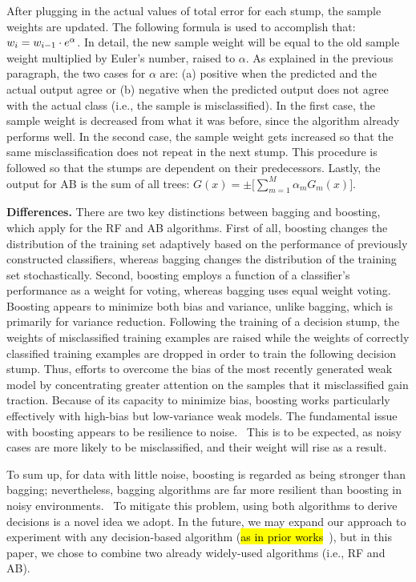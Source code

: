 After plugging in the actual values of total error for each stump, the sample weights are updated. The following formula is used to accomplish that: $w_i = w_{i-1} \cdot e^{\alpha}$.
In detail, the new sample weight will be equal to the old sample weight multiplied by Euler's number, raised to $\alpha$. As explained in the previous paragraph, the two cases for $\alpha$ are: (a) positive when the predicted and the actual output agree or (b) negative when the predicted output does not agree with the actual class (i.e., the sample is misclassified). In the first case, the sample weight is decreased from what it was before, since the algorithm already performs well. In the second case, the sample weight gets increased so that the same misclassification does not repeat in the next stump. This procedure is followed so that the stumps are dependent on their predecessors. Lastly, the output for AB is the sum of all trees: $G(x) = \pm \bigl[ \sum_{m = 1}^M \alpha_m G_m(x) \bigr]$.

\textbf{Differences.} There are two key distinctions between bagging and boosting, which apply for the RF and AB algorithms. First of all, boosting changes the distribution of the training set adaptively based on the performance of previously constructed classifiers, whereas bagging changes the distribution of the training set stochastically. Second, boosting employs a function of a classifier's performance as a weight for voting, whereas bagging uses equal weight voting. Boosting appears to minimize both bias and variance, unlike bagging, which is primarily for variance reduction. Following the training of a decision stump, the weights of misclassified training examples are raised while the weights of correctly classified training examples are dropped in order to train the following decision stump. Thus, efforts to overcome the bias of the most recently generated weak model by concentrating greater attention on the samples that it misclassified gain traction. Because of its capacity to minimize bias, boosting works particularly effectively with high-bias but low-variance weak models. The fundamental issue with boosting appears to be resilience to noise.~\cite{Bauer1999Empirical} This is to be expected, as noisy cases are more likely to be misclassified, and their weight will rise as a result.

To sum up, for data with little noise, boosting is regarded as being stronger than bagging; nevertheless, bagging algorithms are far more resilient than boosting in noisy environments.~\cite{Kotsiantis2007Combining} To mitigate this problem, using both algorithms to derive decisions is a novel idea we adopt. In the future, we may expand our approach to experiment with any decision-based algorithm (\hl{as in prior works}~\cite{Kotsiantis2007CombiningBagging,Kotsiantis2011Combining}), but in this paper, we chose to combine two already widely-used algorithms (i.e., RF and AB).